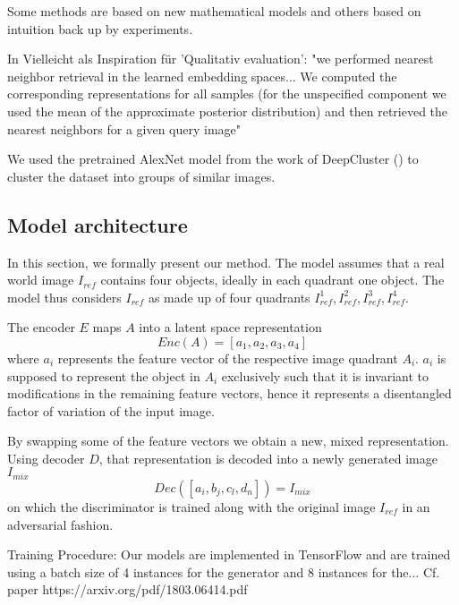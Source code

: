 \documentclass[11pt,a4paper]{article}
\begin{document}
\par Some methods are based on new mathematical models and others based on intuition back up by experiments.

\par In \cite{1611.03383} Vielleicht als Inspiration für 'Qualitativ evaluation': "we performed nearest neighbor retrieval in the learned embedding spaces... We computed the corresponding representations for all samples (for the unspecified component we used the mean of the approximate posterior distribution) and then retrieved the nearest neighbors for a given query image"

\par We used the pretrained AlexNet model from the work of DeepCluster (\cite{1807.05520}) to cluster the dataset into groups of similar images.

\subsection{Model architecture}
In this section, we formally present our method. The model assumes that a real world image $I_{ref}$ contains four objects, ideally in each quadrant one object. The model thus considers $I_{ref}$ as made up of four quadrants $I^1_{ref}, I^2_{ref}, I^3_{ref}, I^4_{ref}$.

The encoder $E$ maps $A$ into a latent space representation
\begin{equation} \label{eq:2}
    Enc(A) = [a_1, a_2, a_3, a_4]
\end{equation}
where $a_i$ represents the feature vector of the respective image quadrant $A_i$. $a_i$ is supposed to represent the object in $A_i$ exclusively such that it is invariant to modifications in the remaining feature vectors, hence it represents a disentangled factor of variation of the input image.

By swapping some of the feature vectors we obtain a new, mixed representation. Using decoder $D$, that representation is decoded into a newly generated image $I_{mix}$
\begin{equation} \label{eq:3}
    Dec([a_i, b_j, c_l, d_n]) = I_{mix}
\end{equation}
on which the discriminator is trained along with the original image $I_{ref}$ in an adversarial fashion.

\par Training Procedure: Our models are implemented in TensorFlow \cite{1605.08695} and are trained using a batch size of 4 instances for the generator and 8 instances for the...
Cf. paper https://arxiv.org/pdf/1803.06414.pdf
\end{document}

